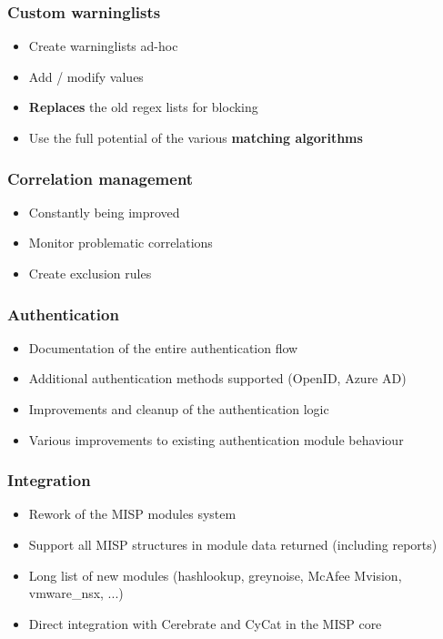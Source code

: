\begin{frame}
\frametitle{Custom warninglists}
\begin{itemize}
	\item Create warninglists ad-hoc
        \item Add / modify values
        \item {\bf Replaces} the old regex lists for blocking
        \item Use the full potential of the various {\bf matching algorithms}
\end{itemize}
\end{frame}

\begin{frame}
\frametitle{Correlation management}
\begin{itemize}
	\item Constantly being improved
        \item Monitor problematic correlations
        \item Create exclusion rules
\end{itemize}
\end{frame}

\begin{frame}
\frametitle{Authentication}
\begin{itemize}
	\item Documentation of the entire authentication flow
        \item Additional authentication methods supported (OpenID, Azure AD)
        \item Improvements and cleanup of the authentication logic
        \item Various improvements to existing authentication module behaviour
\end{itemize}
\end{frame}

\begin{frame}
\frametitle{Integration}
\begin{itemize}
	\item Rework of the MISP modules system
        \item Support all MISP structures in module data returned (including reports)
        \item Long list of new modules (hashlookup, greynoise, McAfee Mvision, vmware_nsx, ...)
        \item Direct integration with Cerebrate and CyCat in the MISP core
\end{itemize}
\end{frame}

